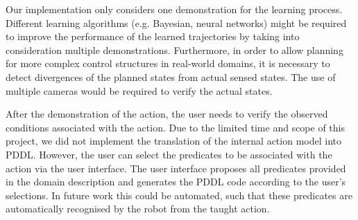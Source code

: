 
Our implementation only considers one demonstration for the learning process. Different learning algorithms (e.g. Bayesian, neural networks) might be required to improve the performance of the learned trajectories by taking into consideration multiple demonstrations. 
Furthermore, in order to allow planning for more complex control structures in real-world domains, it is necessary to detect divergences of the planned states from actual sensed states. The use of multiple cameras would be required to verify the actual states.

After the demonstration of the action, the user needs to verify the observed conditions associated with the action. Due to the limited time and scope of this project, we did not implement the translation of the internal action model into PDDL. However, the user can select the predicates to be associated with the action via the user interface. The user interface proposes all predicates provided in the domain description and generates the PDDL code according to the user's selections.
In future work this could be automated, such that these predicates are automatically recognised by the robot from the taught action.

